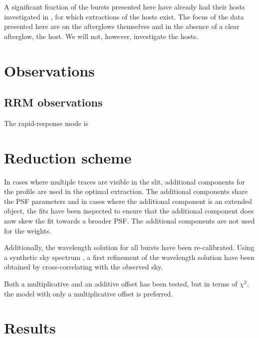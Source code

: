 \documentclass[iop, twocolappendix, numberedappendix, tighten, appendixfloats]{emulateapj}
\begin{document}
	A significant fraction of the bursts presented here  have already had their hosts investigated in \citet{Kruhler2015}, for which extractions of the hosts exist. The focus of the data presented here are on the afterglows themselves and in the absence of a clear afterglow, the host. We will not, however, investigate the hosts. 

	\cleardoublepage

	
	\section{Observations}


	
	\subsection{RRM observations} \label{RRM}
	The rapid-response mode is 
	
	\section{Reduction scheme}


	In cases where multiple traces are visible in the slit, additional components
	for the profile are used in the optimal extraction. The additional components
	share the PSF parameters and in cases where the additional component is an
	extended object, the fits have been inspected to ensure that the additional
	component does now skew the fit towards a broader PSF. The additional
	components are not used for the weights.

	Additionally, the wavelength solution for all bursts have been re-calibrated. Using a synthetic sky spectrum \citep{Noll2012, Jones2013}, a first refinement of the wavelength solution have been obtained by cross-correlating with the observed sky. 
	
	
	Both a multiplicative and an additive offset has been tested, but in terms of $\chi^2$, the model with only a multiplicative offset is preferred. 
	
	
	\section{Results}
		
\end{document}

